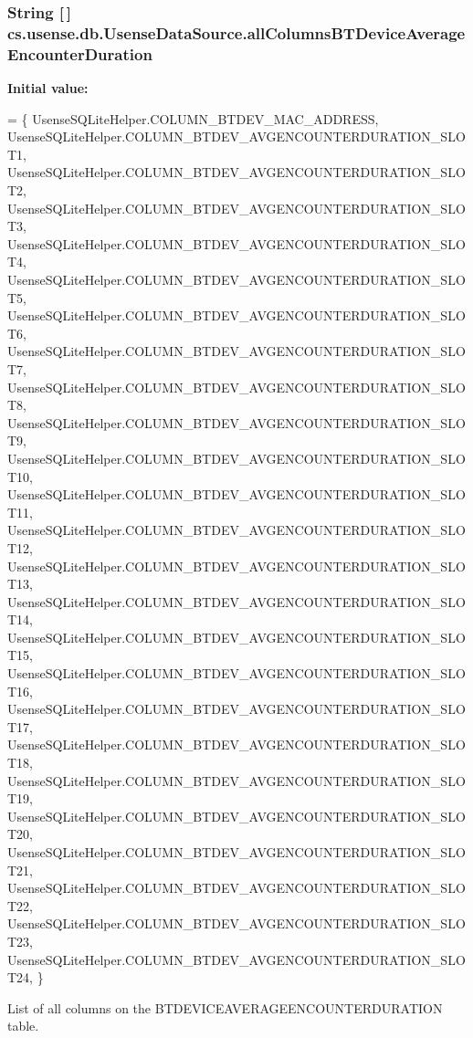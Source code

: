 \subsubsection[{all\+Columns\+B\+T\+Device\+Average\+Encounter\+Duration}]{\setlength{\rightskip}{0pt plus 5cm}String \mbox{[}$\,$\mbox{]} cs.\+usense.\+db.\+Usense\+Data\+Source.\+all\+Columns\+B\+T\+Device\+Average\+Encounter\+Duration\hspace{0.3cm}{\ttfamily [private]}}\label{classcs_1_1usense_1_1db_1_1_usense_data_source_a0b84e480cbc128dfd1931c07b46c98f6}
{\bfseries Initial value\+:}
\begin{DoxyCode}
= \{ 
            UsenseSQLiteHelper.COLUMN\_BTDEV\_MAC\_ADDRESS,
            UsenseSQLiteHelper.COLUMN\_BTDEV\_AVGENCOUNTERDURATION\_SLOT1,
            UsenseSQLiteHelper.COLUMN\_BTDEV\_AVGENCOUNTERDURATION\_SLOT2,
            UsenseSQLiteHelper.COLUMN\_BTDEV\_AVGENCOUNTERDURATION\_SLOT3,
            UsenseSQLiteHelper.COLUMN\_BTDEV\_AVGENCOUNTERDURATION\_SLOT4,
            UsenseSQLiteHelper.COLUMN\_BTDEV\_AVGENCOUNTERDURATION\_SLOT5,
            UsenseSQLiteHelper.COLUMN\_BTDEV\_AVGENCOUNTERDURATION\_SLOT6,
            UsenseSQLiteHelper.COLUMN\_BTDEV\_AVGENCOUNTERDURATION\_SLOT7,
            UsenseSQLiteHelper.COLUMN\_BTDEV\_AVGENCOUNTERDURATION\_SLOT8,
            UsenseSQLiteHelper.COLUMN\_BTDEV\_AVGENCOUNTERDURATION\_SLOT9,
            UsenseSQLiteHelper.COLUMN\_BTDEV\_AVGENCOUNTERDURATION\_SLOT10,
            UsenseSQLiteHelper.COLUMN\_BTDEV\_AVGENCOUNTERDURATION\_SLOT11,
            UsenseSQLiteHelper.COLUMN\_BTDEV\_AVGENCOUNTERDURATION\_SLOT12,
            UsenseSQLiteHelper.COLUMN\_BTDEV\_AVGENCOUNTERDURATION\_SLOT13,
            UsenseSQLiteHelper.COLUMN\_BTDEV\_AVGENCOUNTERDURATION\_SLOT14,
            UsenseSQLiteHelper.COLUMN\_BTDEV\_AVGENCOUNTERDURATION\_SLOT15,
            UsenseSQLiteHelper.COLUMN\_BTDEV\_AVGENCOUNTERDURATION\_SLOT16,
            UsenseSQLiteHelper.COLUMN\_BTDEV\_AVGENCOUNTERDURATION\_SLOT17,
            UsenseSQLiteHelper.COLUMN\_BTDEV\_AVGENCOUNTERDURATION\_SLOT18,
            UsenseSQLiteHelper.COLUMN\_BTDEV\_AVGENCOUNTERDURATION\_SLOT19,
            UsenseSQLiteHelper.COLUMN\_BTDEV\_AVGENCOUNTERDURATION\_SLOT20,
            UsenseSQLiteHelper.COLUMN\_BTDEV\_AVGENCOUNTERDURATION\_SLOT21,
            UsenseSQLiteHelper.COLUMN\_BTDEV\_AVGENCOUNTERDURATION\_SLOT22,
            UsenseSQLiteHelper.COLUMN\_BTDEV\_AVGENCOUNTERDURATION\_SLOT23,
            UsenseSQLiteHelper.COLUMN\_BTDEV\_AVGENCOUNTERDURATION\_SLOT24,
    \}
\end{DoxyCode}
List of all columns on the B\+T\+D\+E\+V\+I\+C\+E\+A\+V\+E\+R\+A\+G\+E\+E\+N\+C\+O\+U\+N\+T\+E\+R\+D\+U\+R\+A\+T\+I\+O\+N table. \hypertarget{classcs_1_1usense_1_1db_1_1_usense_data_source_ae0da67fa4d853379fe723ec28a581de0}{}
